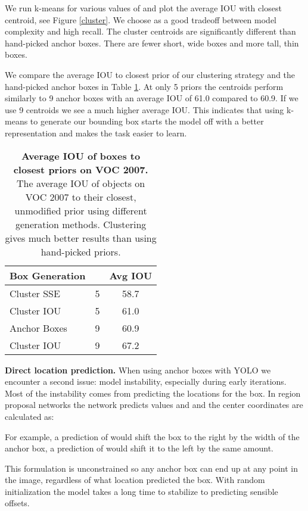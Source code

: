 \documentclass[10pt,twocolumn,letterpaper]{article}
\begin{document}
We run k-means for various values of  and plot the average IOU with closest centroid, see Figure \ref{cluster}. We choose  as a good tradeoff between model complexity and high recall. The cluster centroids are significantly different than hand-picked anchor boxes. There are fewer short, wide boxes and more tall, thin boxes.

We compare the average IOU to closest prior of our clustering strategy and the hand-picked anchor boxes in Table \ref{boxes}. At only 5 priors the centroids perform similarly to 9 anchor boxes with an average IOU of 61.0 compared to 60.9. If we use 9 centroids we see a much higher average IOU. This indicates that using k-means to generate our bounding box starts the model off with a better representation and makes the task easier to learn.

\begin{table}[h]
\begin{center}
\begin{tabular}{lcc}
Box Generation &  & Avg IOU \\
\hline
Cluster SSE & 5 & 58.7 \\
Cluster IOU & 5 & 61.0 \\
Anchor Boxes \cite{ren2015faster}& 9 & 60.9 \\
Cluster IOU & 9 & 67.2 \\
\end{tabular}
\end{center}
\caption{\small \textbf{Average IOU of boxes to closest priors on VOC 2007.} The average IOU of objects on VOC 2007 to their closest, unmodified prior using different generation methods. Clustering gives much better results than using hand-picked priors.}
\label{boxes}
\end{table}

\textbf{Direct location prediction.} When using anchor boxes with YOLO we encounter a second issue: model instability, especially during early iterations. Most of the instability comes from predicting the  locations for the box. In region proposal networks the network predicts values  and  and the  center coordinates are calculated as:



For example, a prediction of  would shift the box to the right by the width of the anchor box, a prediction of  would shift it to the left by the same amount.

This formulation is unconstrained so any anchor box can end up at any point in the image, regardless of what location predicted the box. With random initialization the model takes a long time to stabilize to predicting sensible offsets.
\end{document}
